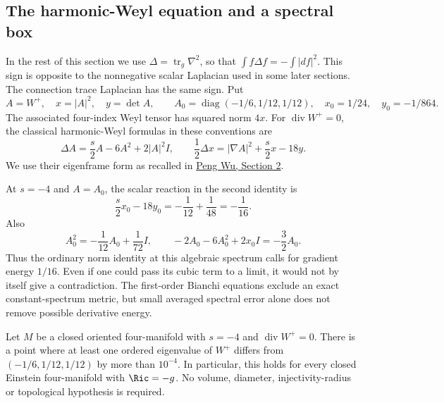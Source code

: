 \subsection{The harmonic-Weyl equation and a spectral box}

In the rest of this section we use
$\Delta=\operatorname{tr}_g\nabla^2$, so that
$\int f\Delta f=-\int|df|^2$.  This sign is opposite to the
nonnegative scalar Laplacian used in some later sections.  The
connection trace Laplacian has the same sign.  Put
\[
 A=W^+,\quad x=|A|^2,\quad y=\det A,\qquad
 A_0=\operatorname{diag}(-1/6,1/12,1/12),
 \quad x_0=1/24,\quad y_0=-1/864.
\]
The associated four-index Weyl tensor has squared norm $4x$.
For $\operatorname{div}W^+=0$, the classical harmonic-Weyl formulas
in these conventions are
\begin{equation}\label{eq:epr-weyl-equation}
 \Delta A=\frac{s}{2}A-6A^2+2|A|^2I,
 \qquad
 \frac12\Delta x=|\nabla A|^2+\frac{s}{2}x-18y.
\end{equation}
We use their eigenframe form as recalled in
\href{https://arxiv.org/pdf/1903.11818}{Peng Wu, Section 2}.

At $s=-4$ and $A=A_0$, the scalar reaction in the second identity is
\begin{equation}\label{eq:epr-norm-reaction}
 \frac{s}{2}x_0-18y_0=-\frac1{12}+\frac1{48}=-\frac1{16}.
\end{equation}
Also
\begin{equation}\label{eq:epr-matrix-reaction}
 A_0^2=-\frac1{12}A_0+\frac1{72}I,
 \qquad -2A_0-6A_0^2+2x_0I=-\frac32A_0.
\end{equation}
Thus the ordinary norm identity at this algebraic spectrum calls for
gradient energy $1/16$.  Even if one could pass its cubic term to a
limit, it would not by itself give a contradiction.  The first-order
Bianchi equations exclude an exact constant-spectrum metric, but
small averaged spectral error alone does not remove possible
derivative energy.

\begin{proposition}
\label{prop:epr-spectral-box}
Let $M$ be a closed oriented four-manifold with $s=-4$ and
$\operatorname{div}W^+=0$.  There is a point where at least one
ordered eigenvalue of $W^+$ differs from
$(-1/6,1/12,1/12)$ by more than $10^{-4}$.  In particular, this
holds for every closed Einstein four-manifold with $\Ric=-g$.
No volume, diameter, injectivity-radius or topological hypothesis
is required.
\end{proposition}

